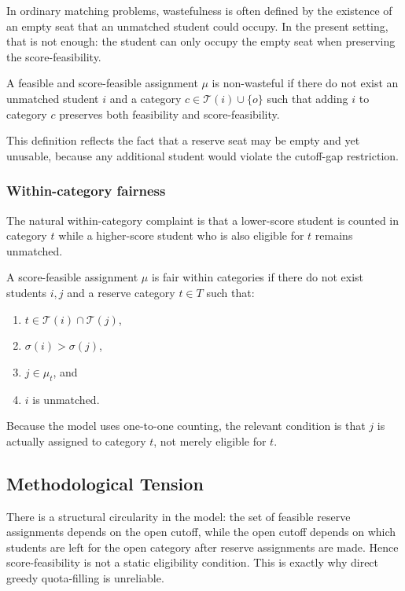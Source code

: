 \documentclass[runningheads]{llncs}
\newcommand{\T}{\mathcal{T}}
\newcommand{\1}{\mathbf{1}}
\begin{document}
In ordinary matching problems, wastefulness is often defined by the existence of an empty seat that an unmatched student could occupy. In the present setting, that is not enough: the student can only occupy the empty seat when preserving the score-feasibility.

\begin{definition}
A feasible and score-feasible assignment $\mu$ is non-wasteful if there do not exist an unmatched student $i$ and a category $c\in \T(i)\cup\{o\}$ such that adding $i$ to category $c$ preserves both feasibility and score-feasibility.
\end{definition}

This definition reflects the fact that a reserve seat may be empty and yet unusable, because any additional student would violate the cutoff-gap restriction.

\subsubsection{Within-category fairness}

The natural within-category complaint is that a lower-score student is counted in category $t$ while a higher-score student who is also eligible for $t$ remains unmatched.

\begin{definition}
A score-feasible assignment $\mu$ is fair within categories if there do not exist students $i,j$ and a reserve category $t\in T$ such that:
\begin{enumerate}
\item $t\in\T(i)\cap\T(j)$,
\item $\sigma(i)>\sigma(j)$,
\item $j\in\mu_t$, and
\item $i$ is unmatched.
\end{enumerate}
\end{definition}

Because the model uses one-to-one counting, the relevant condition is that $j$ is actually assigned to category $t$, not merely eligible for $t$.

\subsection{Methodological Tension}

There is a structural circularity in the model: the set of feasible reserve assignments depends on the open cutoff, while the open cutoff depends on which students are left for the open category after reserve assignments are made. Hence score-feasibility is not a static eligibility condition. This is exactly why direct greedy quota-filling is unreliable.
\end{document}
